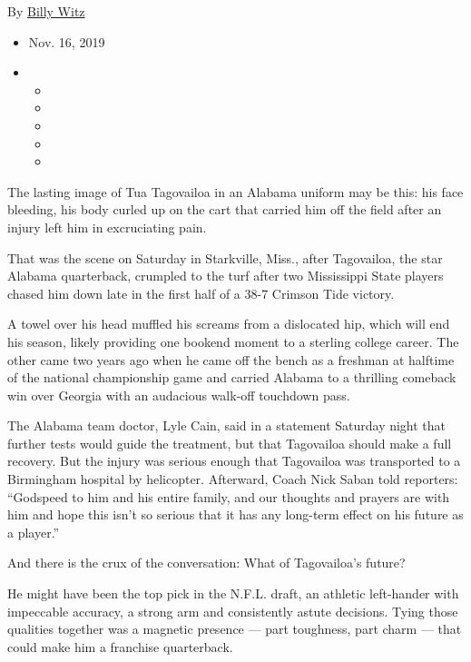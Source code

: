 By \href{https://www.nytimes3xbfgragh.onion/by/billy-witz}{Billy Witz}

\begin{itemize}
\item
  Nov. 16, 2019
\item
  \begin{itemize}
  \item
  \item
  \item
  \item
  \item
  \end{itemize}
\end{itemize}

The lasting image of Tua Tagovailoa in an Alabama uniform may be this:
his face bleeding, his body curled up on the cart that carried him off
the field after an injury left him in excruciating pain.

That was the scene on Saturday in Starkville, Miss., after Tagovailoa,
the star Alabama quarterback, crumpled to the turf after two Mississippi
State players chased him down late in the first half of a 38-7 Crimson
Tide victory.

A towel over his head muffled his screams from a dislocated hip, which
will end his season, likely providing one bookend moment to a sterling
college career. The other came two years ago when he came off the bench
as a freshman at halftime of the national championship game and carried
Alabama to a thrilling comeback win over Georgia with an audacious
walk-off touchdown pass.

The Alabama team doctor, Lyle Cain, said in a statement Saturday night
that further tests would guide the treatment, but that Tagovailoa should
make a full recovery. But the injury was serious enough that Tagovailoa
was transported to a Birmingham hospital by helicopter. Afterward, Coach
Nick Saban told reporters: ``Godspeed to him and his entire family, and
our thoughts and prayers are with him and hope this isn't so serious
that it has any long-term effect on his future as a player.''

And there is the crux of the conversation: What of Tagovailoa's future?

He might have been the top pick in the N.F.L. draft, an athletic
left-hander with impeccable accuracy, a strong arm and consistently
astute decisions. Tying those qualities together was a magnetic presence
--- part toughness, part charm --- that could make him a franchise
quarterback.

